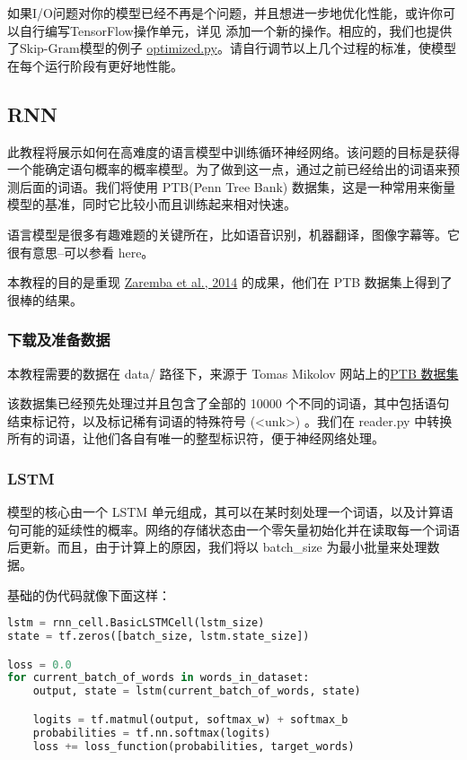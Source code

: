 如果I/O问题对你的模型已经不再是个问题，并且想进一步地优化性能，或许你可以自行编写TensorFlow操作单元，详见 添加一个新的操作。相应的，我们也提供了Skip-Gram模型的例子 \href{https://github.com/bleedingfight/models/tree/master/tutorials/embedding}{optimized.py}。请自行调节以上几个过程的标准，使模型在每个运行阶段有更好地性能。
\subsection{RNN}
此教程将展示如何在高难度的语言模型中训练循环神经网络。该问题的目标是获得一个能确定语句概率的概率模型。为了做到这一点，通过之前已经给出的词语来预测后面的词语。我们将使用 PTB(Penn Tree Bank) 数据集，这是一种常用来衡量模型的基准，同时它比较小而且训练起来相对快速。

语言模型是很多有趣难题的关键所在，比如语音识别，机器翻译，图像字幕等。它很有意思--可以参看 here。

本教程的目的是重现 \href{http://arxiv.org/abs/1409.2329}{Zaremba et al., 2014} 的成果，他们在 PTB 数据集上得到了很棒的结果。
\subsubsection{下载及准备数据}
本教程需要的数据在 data/ 路径下，来源于 Tomas Mikolov 网站上的\href{http://www.fit.vutbr.cz/~imikolov/rnnlm/simple-examples.tg}{PTB 数据集}

该数据集已经预先处理过并且包含了全部的 10000 个不同的词语，其中包括语句结束标记符，以及标记稀有词语的特殊符号 (<unk>) 。我们在 reader.py 中转换所有的词语，让他们各自有唯一的整型标识符，便于神经网络处理。
\subsubsection{LSTM}
模型的核心由一个 LSTM 单元组成，其可以在某时刻处理一个词语，以及计算语句可能的延续性的概率。网络的存储状态由一个零矢量初始化并在读取每一个词语后更新。而且，由于计算上的原因，我们将以 batch\_size 为最小批量来处理数据。

基础的伪代码就像下面这样：
\begin{lstlisting}[language=Python]
lstm = rnn_cell.BasicLSTMCell(lstm_size)
state = tf.zeros([batch_size, lstm.state_size])

loss = 0.0
for current_batch_of_words in words_in_dataset:
    output, state = lstm(current_batch_of_words, state)

    logits = tf.matmul(output, softmax_w) + softmax_b
    probabilities = tf.nn.softmax(logits)
    loss += loss_function(probabilities, target_words)
\end{lstlisting}
